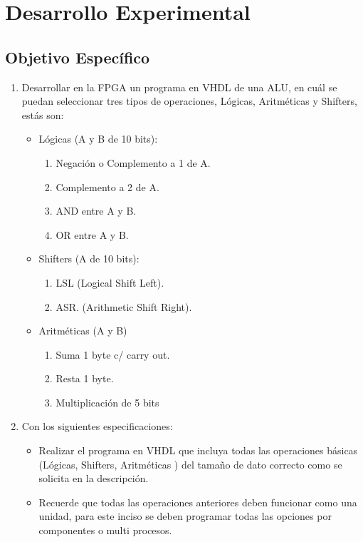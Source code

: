 \section{Desarrollo Experimental}
	\setlength{\parindent}{1em}
	\setlength{\parskip}{10pt}
	\subsection{Objetivo Espec\'ifico}
	\begin{enumerate}
		\item Desarrollar en la FPGA un programa en VHDL de una ALU,  en cu\'al se puedan seleccionar tres tipos de operaciones, L\'ogicas, Aritm\'eticas y Shifters, est\'as son:
		\begin{itemize}
			\item L\'ogicas (A y B de 10 bits):
			\begin{enumerate}
				\item Negaci\'on o Complemento a 1 de A.
				\item Complemento a 2 de A.
				\item AND entre A y B.
				\item OR entre A y B.
			\end{enumerate}
			\item Shifters (A de 10 bits):
			\begin{enumerate}
				\item LSL (Logical Shift Left).
				\item ASR. (Arithmetic Shift Right).
			\end{enumerate}
			\item Aritm\'eticas (A y B)
			\begin{enumerate}
				\item Suma 1 byte c/ carry out.
				\item Resta 1 byte.
				\item Multiplicaci\'on de 5 bits
			\end{enumerate}
		\end{itemize}
		\item Con los siguientes especificaciones:
		\begin{itemize}
			\item Realizar el programa en VHDL que incluya todas las operaciones b\'asicas (L\'ogicas, Shifters, Aritm\'eticas ) del tama\~no de dato correcto como se solicita en la descripci\'on.
			\item Recuerde que todas las operaciones anteriores deben funcionar como una unidad, para este inciso se deben programar todas las opciones por componentes o multi procesos.

\end{itemize}
\end{enumerate}
